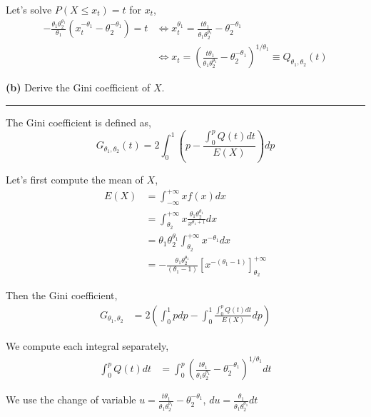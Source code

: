\documentclass[10pt, a4paper, nofootinbib]{scrartcl}
\begin{document}
Let's solve $P(X \leq x_t) = t$ for $x_t$,
\begin{align*}
  - \frac{\theta_1 \theta_2^{\theta_1}}{\theta_1} \left( x_t^{-\theta_1} - \theta_2^{-\theta_1} \right) = t 
    &\iff x_t^{\theta_1} 
      = \frac{t \theta_1}{\theta_1 \theta_2^{\theta_1}} - \theta_2^{-\theta_1} \\
    &\iff x_t 
      = \left( \frac{t \theta_1}{\theta_1 \theta_2^{\theta_1}} - \theta_2^{-\theta_1} \right)^{1/\theta_1} \equiv Q_{\theta_1, \theta_2}(t)
\end{align*}

\textbf{(b)} Derive the Gini coefficient of $X$.

\begin{center}\rule{6cm}{0.4pt}\end{center}

The Gini coefficient is defined as, 
\begin{equation}
  G_{\theta_1, \theta_2}(t) = 2 \int_{0}^{1} \left( p - \frac{\int_{0}^{p} Q(t) dt}{E(X)} \right) dp
\end{equation}

Let's first compute the mean of $X$,
\begin{align*}
  E(X)
    &= \int_{-\infty}^{+\infty} x f(x) dx \\
    &= \int_{\theta_2}^{+\infty} x \frac{\theta_1 \theta_2^{\theta_1}}{x^{\theta_1 + 1}} dx \\
    &= \theta_1 \theta_2^{\theta_1} \int_{\theta_2}^{+\infty} x^{- \theta_1} dx \\
    &= - \frac{\theta_1 \theta_2^{\theta_1}}{(\theta_1 - 1)} \left[ x^{-(\theta_1 - 1)} \right]_{\theta_2}^{+\infty}
\end{align*}

Then the Gini coefficient, 
\begin{align*}
  G_{\theta_1, \theta_2}
    &= 2 \left( \int_{0}^{1} p dp - \int_{0}^{1} \frac{\int_{0}^{p} Q(t) dt}{E(X)} dp \right) 
\end{align*}

We compute each integral separately,
\begin{align*}
  \int_0^p Q(t) dt 
    &= \int_0^p \left( \frac{t \theta_1}{\theta_1 \theta_2^{\theta_1}} - \theta_2^{-\theta_1} \right)^{1/\theta_1} dt
\end{align*}

We use the change of variable $u = \frac{t \theta_1}{\theta_1 \theta_2^{\theta_1}} - \theta_2^{-\theta_1}$, $du = \frac{\theta_1}{\theta_1 \theta_2^{\theta_1}} dt$
\end{document}
